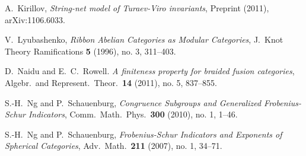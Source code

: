 \documentclass{ws-jktr}
\begin{document}
\begin{thebibliography}{0}

 A.\ Kirillov, \emph{String-net model of {Turaev-Viro} invariants}, Preprint (2011), arXiv:1106.6033.






 V.\ Lyubashenko, \emph{Ribbon Abelian Categories as Modular Categories}, J.\ Knot Theory Ramifications \textbf{5} (1996), no. 3, 311--403.

 D.\ Naidu and E.\ C.\ Rowell. \emph{A finiteness property for braided fusion categories}, Algebr.\ and Represent.\ Theor.\ \textbf{14} (2011), no. 5, 837--855.

 S.-H.\ Ng and P.\ Schauenburg, \emph{Congruence Subgroups and Generalized {Frobenius-Schur} Indicators}, Comm.\ Math.\ Phys.\ \textbf{300} (2010), no. 1, 1--46.

 S.-H.\ Ng and P.\ Schauenburg, \emph{{Frobenius-Schur} Indicators and Exponents of Spherical Categories}, Adv.\ Math.\ \textbf{211} (2007), no. 1, 34--71.




\end{thebibliography}
\end{document}

